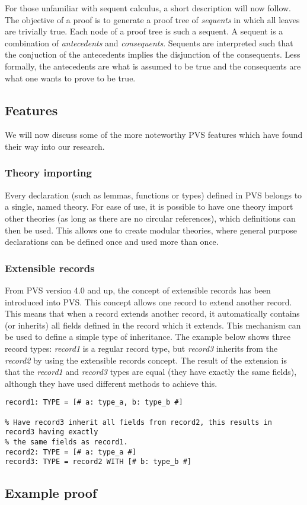 For those unfamiliar with sequent calculus, a short description will now follow. The objective of a proof is to generate a proof tree of \emph{sequents} in which all leaves are trivially true. Each node of a proof tree is such a sequent. A sequent is a combination of \emph{antecedents} and \emph{consequents}. Sequents are interpreted such that the conjuction of the antecedents implies the disjunction of the consequents. Less formally, the antecedents are what is assumed to be true and the consequents are what one wants to prove to be true.

\subsection{Features}
We will now discuss some of the more noteworthy PVS features which have found their way into our research.

\subsubsection{Theory importing}
Every declaration (such as lemmas, functions or types) defined in PVS belongs to a single, named theory. For ease of use, it is possible to have one theory import other theories (as long as there are no circular references), which definitions can then be used. This allows one to create modular theories, where general purpose declarations can be defined once and used more than once.

\subsubsection{Extensible records}
From PVS version 4.0 and up, the concept of extensible records has been introduced into PVS. This concept allows one record to extend another record. This means that when a record extends another record, it automatically contains (or inherits) all fields defined in the record which it extends. This mechanism can be used to define a simple type of inheritance. The example below shows three record types: \emph{record1} is a regular record type, but \emph{record3} inherits from the \emph{record2} by using the extensible records concept. The result of the extension is that the \emph{record1} and \emph{record3} types are equal (they have exactly the same fields), although they have used different methods to achieve this.

\lstset{language=PVS}
\begin{lstlisting}[caption={PVS: example of the extensible records mechanism.}]
% record1 does not inherit any fields, it defines them all itself.
record1: TYPE = [# a: type_a, b: type_b #]

% Have record3 inherit all fields from record2, this results in record3 having exactly
% the same fields as record1.
record2: TYPE = [# a: type_a #]
record3: TYPE = record2 WITH [# b: type_b #]
\end{lstlisting}

\subsection{Example proof}

